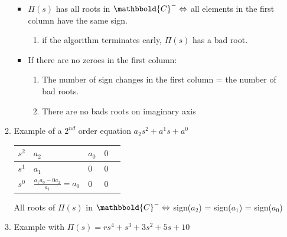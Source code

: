 \begin{enumerate}
\begin{enumerate}
                    \begin{itemize}
                        \item $\Pi(s)$ has all roots in $\mathbbold{C}^- \Leftrightarrow $ all elements in the first column have the same sign.
                            \begin{enumerate}
                                \item if the algorithm terminates early, $\Pi(s)$ has a bad root.
                            \end{enumerate}
                        \item If there are no zeroes in the first column:
                            \begin{enumerate}
                                \item The number of sign changes in the first column = the number of bad roots.
                                \item There are no bads roots on imaginary axis
                            \end{enumerate}
                    \end{itemize}

                \item Example of a $2^{nd}$ order equation $a_2 s^2 + a^1 s + a^0$

                    \begin{table}[h]
                        \centering
                        \begin{tabular}{ | l || l | l | l | l | }
                            \hline
                            \hline

                            $s^2$ & $a_2$ & $a_0$ & $0$ \\ \hline
                            $s^1$ & $a_1$ & $0$ & $0$ \\ \hline
                            $s^0$ & $\frac{a_1 a_0 - 0 a_2}{a_1} = a_0$ & $0$ & $0$ \\ \hline
                        \end{tabular}
                    \end{table}
                    All roots of $\Pi(s)$ in $\mathbbold{C}^- \Leftrightarrow$ sign($a_2$) = sign($a_1$) = sign($a_0$)

                \item Example with $\Pi(s) = rs^4 + s^3 + 3s^2 + 5s + 10$
                    \begin{table}[h]
                        \centering
                        \begin{tabular}{ | l || l | l | l | l | }
                            \hline
                            \hline


\end{tabular}
\end{table}
\end{enumerate}
\end{enumerate}
